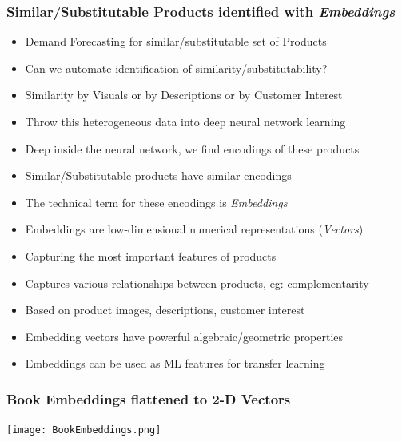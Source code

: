 \documentclass[handout]{beamer}
\begin{document}
\begin{frame}
\frametitle{Similar/Substitutable Products identified with {\em Embeddings}}
\pause
\begin{itemize}[<+->]
\item Demand Forecasting for similar/substitutable set of Products
\item Can we automate identification of similarity/substitutability?
\item Similarity by Visuals or by Descriptions or by Customer Interest
\item Throw this heterogeneous data into deep neural network learning
\item Deep inside the neural network, we find encodings of these products
\item Similar/Substitutable products have similar encodings
\item The technical term for these encodings is {\em Embeddings}
\item Embeddings are low-dimensional numerical representations ({\em Vectors})
\item Capturing the most important features of products
\item Captures various relationships between products, eg: complementarity
\item Based on product images, descriptions, customer interest
\item Embedding vectors have powerful algebraic/geometric properties
\item Embeddings can be used as ML features for transfer learning
\end{itemize}
\end{frame}

\begin{frame}
\frametitle{Book Embeddings flattened to 2-D Vectors}
\texttt{[image: BookEmbeddings.png]}
\end{frame}
\end{document}
